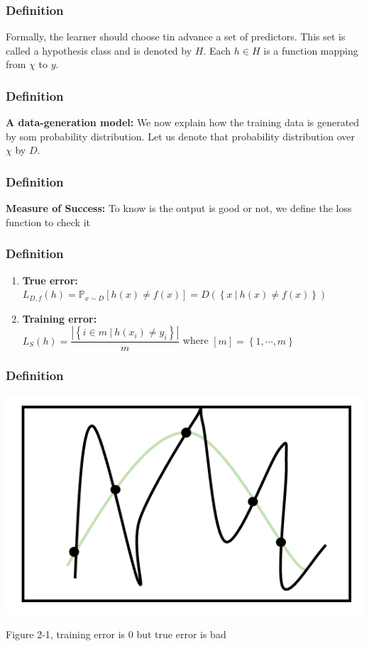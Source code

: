 \documentclass[xcolor=dvipsnames]{beamer}
\theoremstyle{plain}
\newcommand{\sett}[1]{\left\{#1 \right\}}
\begin{document}
\begin{frame}
	\frametitle{Definition}
	Formally, the learner should choose tin advance a set of predictors. This set is called a hypothesis class and is denoted by $H$. Each $h \in H$ is a function mapping from $\chi$ to $y$.
\end{frame}


\begin{frame}
	\frametitle{Definition}
	\textbf{A data-generation model:} We now explain how the training data is generated by som probability distribution. Let us denote that probability distribution over $\chi$ by $D$.
	
\end{frame}

\begin{frame}
	\frametitle{Definition}
	\textbf{Measure of Success:} To know is the output is good or not, we define the loss function to check it
	
\end{frame}

\begin{frame}
	\frametitle{Definition}
	\begin{enumerate}
		\item \textbf{True error:} $L_{D,f}(h) = \mathbb{P}_{x\sim D}[h(x) \neq f(x)] = D(\sett{x ~|~ h(x) \neq f(x)})$
		\item \textbf{Training error:} \\ $L_S(h) = \dfrac{|\sett{i \in m ~|~ h(x_i) \neq y_i} |}{m}$ where $[m] = \sett{1,\cdots,m}$
	\end{enumerate}
	
\end{frame}

\begin{frame}
	\frametitle{Definition}
	\begin{center}
		\includegraphics[scale = 0.3]{./figure/2-1.png}
		
		Figure 2-1, training error is $0$ but true error is bad
	\end{center}
	
\end{frame}
\end{document}

